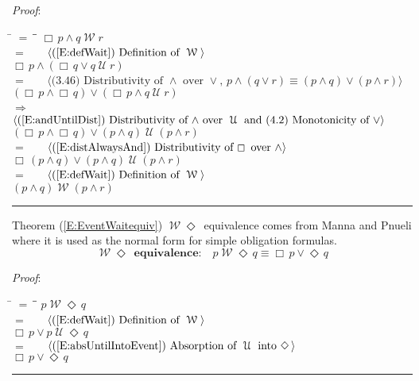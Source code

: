 \documentclass[12pt, fleqn, leqno]{article}
\newcommand{\lgap}{2pt}                             %
\newcommand{\mymathindent}{24pt}                    %
\newcommand{\impl}{\ensuremath{\Rightarrow}}        %
\newcommand{\Until}{\;\mathcal{U}\;}
\newcommand{\Wait}{\;\mathcal{W}\;}
\newcommand{\Event}{\Diamond\,}
\newcommand{\Always}{\Box\,}
\newcommand{\myqed}{\rule[-.23ex]{1.2ex}{2.0ex}}
\newcommand{\myqedtab}{\hspace{384pt}}              %
\newcommand{\Gll} {\langle}                         %
\newcommand{\Ggg} {\rangle}                         %
\newcommand{\Hint}[1]     {\ \ \ $\Gll              \mbox{#1} \Ggg$ }   %
\begin{document}
\emph{Proof}:
\begin{tabbing}
\hspace{\mymathindent} \= $= \;$ \= \myqedtab \= \kill
  \> \>   $\Always p \land q \Wait r$\\[\lgap]
  \> $=$ \> \Hint{(\ref{E:defWait}) Definition of $\Wait$} \\[\lgap]
  \> \>   $\Always p \land (\Always q \lor q\Until r)$\\[\lgap]
  \> $=$  \>  \Hint{(3.46) Distributivity of $\land$ over $\lor$, $p\land (q\lor r)\equiv (p\land q)\lor (p\land r)$}\\[\lgap]
  \> \>   $(\Always p \land \Always q) \lor (\Always p\land q\Until r)$\\[\lgap]
  \> $\impl$  \>  \Hint{(\ref{E:andUntilDist}) Distributivity of $\land$ over $\Until$ and (4.2) Monotonicity of $\lor$}\\[\lgap]
  \> \>   $(\Always p \land \Always q) \lor (p\land q)\Until (p\land r)$\\[\lgap]
  \> $=$ \> \Hint{(\ref{E:distAlwaysAnd}) Distributivity of $\Always$ over $\land$} \\[\lgap]
  \> \>   $\Always (p \land q) \lor (p\land q)\Until (p\land r)$\\[\lgap]
  \> $=$ \> \Hint{(\ref{E:defWait}) Definition of $\Wait$} \\[\lgap]
  \> \>   $(p \land q) \Wait (p \land r)$ \quad \myqed
\end{tabbing}

Theorem (\ref{E:EventWaitequiv}) $\Wait\Event$ equivalence comes from Manna and Pnueli \cite{Manna}
where it is used as the normal form for simple obligation formulas.
\begin{equation}\label{E:EventWaitequiv}
\textbf{$\Wait\Event$ equivalence:}\quad p\Wait\Event q \equiv \Always p \lor \Event q
\end{equation}

\emph{Proof}:
\begin{tabbing}
\hspace{\mymathindent} \= $= \;$ \= \myqedtab \= \kill
\> \> $p \Wait \Event q$\\[\lgap]
\> $=$ \> \Hint{(\ref{E:defWait}) Definition of $\Wait$} \\[\lgap]
\> \> $\Always p\lor p \Until \Event q$\\[\lgap]
\> $=$ \> \Hint{(\ref{E:absUntilIntoEvent}) Absorption of $\Until$ into $\Event$} \\[\lgap]
\> \> $\Always p \lor \Event q$ \quad \myqed
\end{tabbing}
\end{document}
